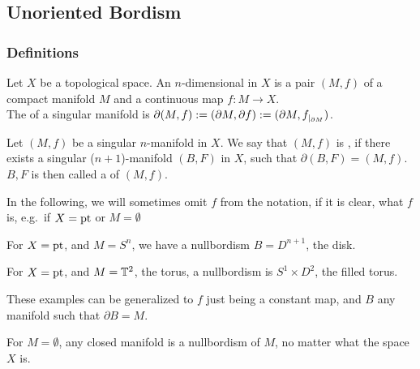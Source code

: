 \documentclass[a4paper,12pt]{article}
\begin{document}
\subsection{Unoriented Bordism}
\subsubsection{Definitions}

\begin{definition}\label{singular manifold}
    Let \(X\) be a topological space. An \(n\)-dimensional  in \(X\) is a pair \((M,f)\) of a compact manifold \(M\) and a continuous map \(f:M\to X\).\\
    The  of a singular manifold is \(\partial(M,f):=(\partial M, \partial f):=(\partial M,f_{|_{\partial M}})\).
\end{definition}

\begin{definition}
    Let \((M,f)\) be a singular \(n\)-manifold in \(X\). We say that \((M,f)\) is , if there exists a singular (\(n+1\))-manifold \((B,F)\) in \(X\), such that \(\partial(B,F)=(M,f)\).\\
    \(B,F\) is then called a  of \((M,f)\).
\end{definition}

In the following, we will sometimes omit \(f\) from the notation, if it is clear, what \(f\) is, e.g.\ if \(X=\mathrm{pt}\) or \(M=\emptyset\)

\begin{example}
    For \(X=\mathrm{pt}\), and \(M=S^n\), we have a nullbordism \(B=D^{n+1}\), the disk.%
\end{example}

\begin{example}
    For \(X=\mathrm{pt}\), and \(M=\mathbb{T}^2\), the torus, a nullbordism is \(S^1\times D^2\), the filled torus.
\end{example}

\begin{remark}
    These examples can be generalized to \(f\) just being a constant %
    map, and \(B\) any manifold such that \(\partial B=M\). 
\end{remark}

\begin{example}
    For \(M=\emptyset\), any closed manifold is a nullbordism of \(M\), no matter what the space \(X\) is.%
\end{example}
\end{document}
